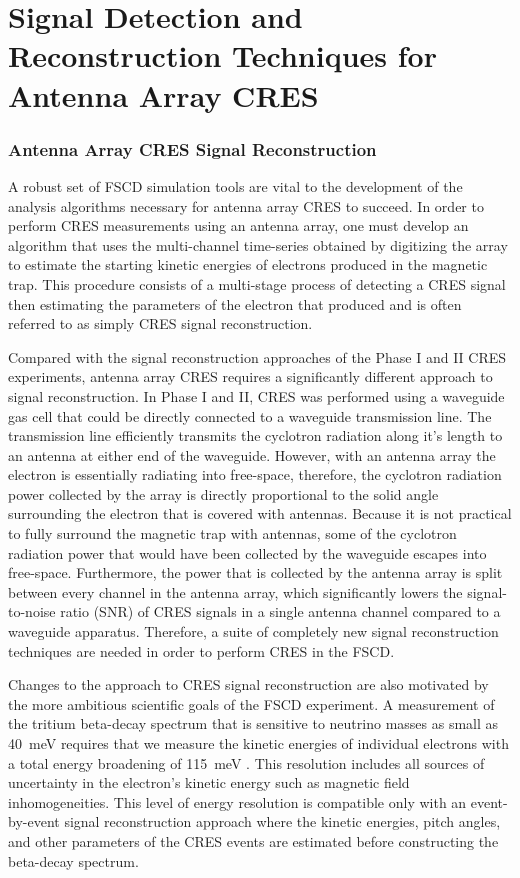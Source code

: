 \section{Signal Detection and Reconstruction Techniques for Antenna Array CRES}
\label{sec:chap4-pter}

\subsubsection*{Antenna Array CRES Signal Reconstruction}

A robust set of FSCD simulation tools are vital to the development of the analysis algorithms necessary for antenna array CRES to succeed. In order to perform CRES measurements using an antenna array, one must develop an algorithm that uses the multi-channel time-series obtained by digitizing the array to estimate the starting kinetic energies of electrons produced in the magnetic trap. This procedure consists of a multi-stage process of detecting a CRES signal then estimating the parameters of the electron that produced and is often referred to as simply CRES signal reconstruction.

Compared with the signal reconstruction approaches of the Phase I and II CRES experiments, antenna array CRES requires a significantly different approach to signal reconstruction. In Phase I and II, CRES was performed using a waveguide gas cell that could be directly connected to a waveguide transmission line. The transmission line efficiently transmits the cyclotron radiation along it's length to an antenna at either end of the waveguide. However, with an antenna array the electron is essentially radiating into free-space, therefore, the cyclotron radiation power collected by the array is directly proportional to the solid angle surrounding the electron that is covered with antennas. Because it is not practical to fully surround the magnetic trap with antennas, some of the cyclotron radiation power that would have been collected by the waveguide escapes into free-space. Furthermore, the power that is collected by the antenna array is split between every channel in the antenna array, which significantly lowers the signal-to-noise ratio (SNR) of CRES signals in a single antenna channel compared to a waveguide apparatus. Therefore, a suite of completely new signal reconstruction techniques are needed in order to perform CRES in the FSCD.

Changes to the approach to CRES signal reconstruction are also motivated by the more ambitious scientific goals of the FSCD experiment. A measurement of the tritium beta-decay spectrum that is sensitive to neutrino masses as small as 40~meV requires that we measure the kinetic energies of individual electrons with a total energy broadening of 115~meV \cite{p8bayesian}. This resolution includes all sources of uncertainty in the electron's kinetic energy such as magnetic field inhomogeneities. This level of energy resolution is compatible only with an event-by-event signal reconstruction approach where the kinetic energies, pitch angles, and other parameters of the CRES events are estimated before constructing the beta-decay spectrum. 

